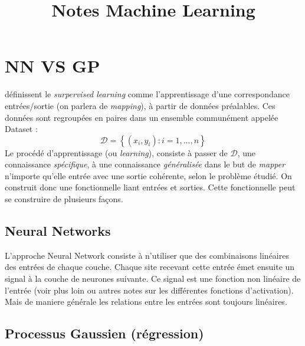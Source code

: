 \documentclass[a4paper,12pt]{report}
\title{\navy \textbf{Notes Machine Learning} \color{black}}%
\date{}
\newcommand\bk{\color{black}}
\newcommand\navy{\color{navy}}
\numberwithin{equation}{section} %
\begin{document}
\maketitle

\tableofcontents



\newpage 

\navy \chapter{NN VS GP} \bk
\cite{rasmussen2006gaussian} définissent le \textit{surpervised learning} comme l'apprentissage d'une correspondance entrées/sortie (on parlera de \textit{mapping}), à partir de données préalables. Ces données sont regroupées en paires dans un ensemble communément appelée Dataset : \\ 
\begin{equation}
\mathcal{D} = \left\{ \left( x_i, y_i \right) : i = 1,. . ., n \right\}
\end{equation}
\noindent Le procédé d'apprentissage (ou \textit{learning}), consiste à passer de $\mathcal{D}$, une connaissance \textit{spécifique}, à une connaissance \textit{généralisée} dans le but de \textit{mapper} n'importe qu'elle entrée avec une sortie cohérente, selon le problème étudié. On construit donc une fonctionnelle liant entrées et sorties. Cette fonctionnelle peut se construire de plusieurs façons. 
\section{Neural Networks}
L'approche Neural Network consiste à n'utiliser que des combinaisons linéaires des entrées de chaque couche. Chaque site recevant cette entrée émet ensuite un signal à la couche de neurones suivante. Ce signal est une fonction non linéaire de l'entrée (voir plus loin ou autres notes sur les différentes fonctions d'activation). \\
Mais de maniere générale les relations entre les entrées sont toujours linéaires.
\section{Processus Gaussien (régression)}

\end{document}
